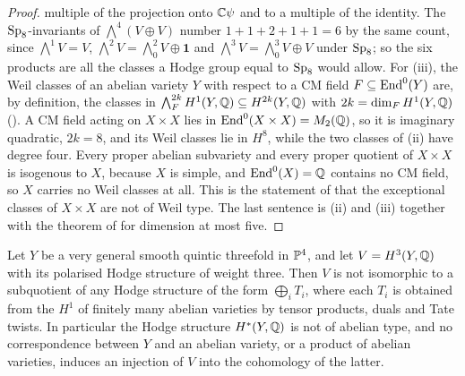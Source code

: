 \begin{proof}
multiple of the projection onto $\mathbb{C}\psi$ and to a multiple of the
identity. The $\operatorname{Sp}_{8}$-invariants of $\bigwedge^{4}(V\oplus V)$ number
$1+1+2+1+1=6$ by the same count, since $\bigwedge^{1}V=V$,
$\bigwedge^{2}V=\bigwedge^{2}_{0}V\oplus\mathbf{1}$ and
$\bigwedge^{3}V=\bigwedge^{3}_{0}V\oplus V$ under $\operatorname{Sp}_{8}$; so the six
products are all the classes a Hodge group equal to $\operatorname{Sp}_{8}$ would allow. For (iii), the Weil classes of an abelian
variety $Y$ with respect to a CM field $F\subseteq\operatorname{End}^{0}(Y)$ are, by
definition, the classes in $\bigwedge^{2k}_{F}H^{1}(Y,\mathbb{Q})\subseteq
H^{2k}(Y,\mathbb{Q})$ with $2k=\dim_{F}H^{1}(Y,\mathbb{Q})$ (). A CM
field acting on $X\times X$ lies in $\operatorname{End}^{0}(X\times X)=M_{2}(\mathbb{Q})$, so it is
imaginary quadratic, $2k=8$, and its Weil classes lie in $H^{8}$, while the two
classes of (ii) have degree four. Every proper
abelian subvariety and every proper quotient of $X\times X$ is isogenous to
$X$, because $X$ is simple, and $\operatorname{End}^{0}(X)=\mathbb{Q}$ contains no CM field, so $X$
carries no Weil classes at all. This is the statement of \cite[0.1(iii)]{MZ99}
that the exceptional classes of $X\times X$ are not of Weil type. The last
sentence is (ii) and (iii) together with the theorem of \cite{MZ99} for
dimension at most five.
\end{proof}

\begin{proposition}
\label{prop:noabeliantype}
Let $Y$ be a very general smooth quintic threefold in $\mathbb{P}^{4}$, and let
$V=H^{3}(Y,\mathbb{Q})$ with its polarised Hodge structure of weight three. Then $V$
is not isomorphic to a subquotient of any Hodge structure of the form
$\bigoplus_{i}T_{i}$, where each $T_{i}$ is obtained from the $H^{1}$ of
finitely many abelian varieties by tensor products, duals and Tate twists. In
particular the Hodge structure $H^{*}(Y,\mathbb{Q})$ is not of abelian type, and no
correspondence between $Y$ and an abelian variety, or a product of abelian
varieties, induces an injection of $V$ into the cohomology of the latter.
\end{proposition}

